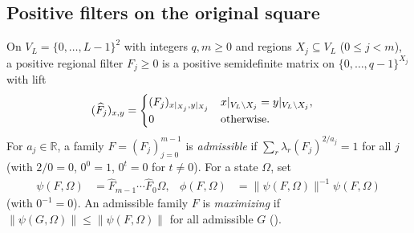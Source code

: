 \subsection{Positive filters on the original square}
\label{sec:pinned_square_filters}

\begin{definition}
    \label{def:pinned_square_filters}
    \leanok
    On $V_L=\{0,\ldots,L-1\}^2$ with integers $q,m\ge0$ and regions $X_j\subseteq V_L$ ($0\le j<m$), a positive regional filter $F_j\ge0$ is a positive semidefinite matrix on $\{0,\ldots,q-1\}^{X_j}$ with lift
    \begin{align}
        (\widehat F_j)_{x,y}
         & =\begin{cases}
                (F_j)_{x|_{X_j},y|_{X_j}} & x|_{V_L\setminus X_j}=y|_{V_L\setminus X_j}, \\
                0                         & \text{otherwise}.
            \end{cases}\notag
    \end{align}
    For $a_j\in\mathbb R$, a family $F=(F_j)_{j=0}^{m-1}$ is \emph{admissible} if $\sum_r\lambda_r(F_j)^{2/a_j}=1$ for all $j$ (with $2/0=0$, $0^0=1$, $0^t=0$ for $t\ne0$). For a state $\Omega$, set
    \begin{align}
        \psi(F,\Omega) & =\widehat F_{m-1}\cdots\widehat F_0\Omega, &
        \phi(F,\Omega) & =\|\psi(F,\Omega)\|^{-1}\psi(F,\Omega)
        \label{eq:pinned_filter_output}
    \end{align}
    (with $0^{-1}=0$). An admissible family $F$ is \emph{maximizing} if $\|\psi(G,\Omega)\|\le\|\psi(F,\Omega)\|$ for all admissible $G$ (\cite{OpenAI2026PolynomialPEPS}).
\end{definition}

